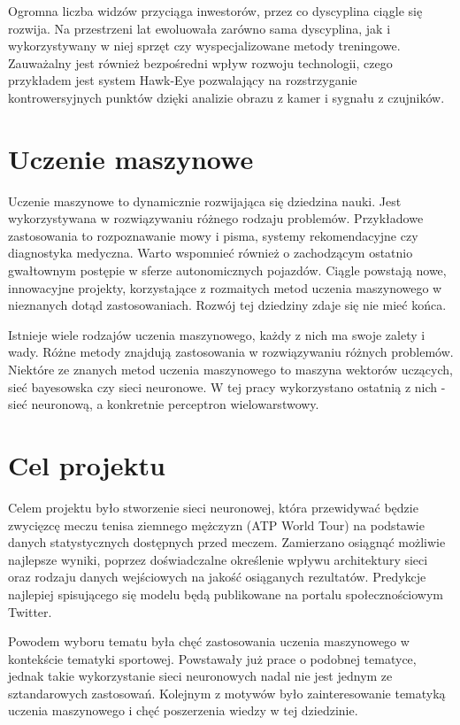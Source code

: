 Ogromna liczba widzów przyciąga inwestorów, przez co dyscyplina ciągle się rozwija. Na przestrzeni lat ewoluowała zarówno sama dyscyplina, jak i wykorzystywany w niej sprzęt czy wyspecjalizowane metody treningowe. Zauważalny jest również bezpośredni wpływ rozwoju technologii, czego przykładem jest system Hawk-Eye pozwalający na rozstrzyganie kontrowersyjnych punktów dzięki analizie obrazu z kamer i sygnału z czujników.



\section{Uczenie maszynowe}
Uczenie maszynowe to dynamicznie rozwijająca się dziedzina nauki. Jest wykorzystywana w rozwiązywaniu różnego rodzaju problemów. Przykładowe zastosowania to rozpoznawanie mowy i pisma, systemy rekomendacyjne czy diagnostyka medyczna. Warto wspomnieć również o zachodzącym ostatnio gwałtownym postępie w sferze autonomicznych pojazdów. Ciągle powstają nowe, innowacyjne projekty, korzystające z rozmaitych metod uczenia maszynowego w nieznanych dotąd zastosowaniach. Rozwój tej dziedziny zdaje się nie mieć końca.

Istnieje wiele rodzajów uczenia maszynowego, każdy z nich ma swoje zalety i wady. Różne metody znajdują zastosowania w rozwiązywaniu różnych problemów. Niektóre ze znanych metod uczenia maszynowego to maszyna wektorów uczących, sieć bayesowska czy sieci neuronowe. W tej pracy wykorzystano ostatnią z nich - sieć neuronową, a konkretnie perceptron wielowarstwowy.

\section{Cel projektu}
Celem projektu było stworzenie sieci neuronowej, która przewidywać będzie zwycięzcę meczu tenisa ziemnego mężczyzn (ATP World Tour) na podstawie danych statystycznych dostępnych przed meczem. Zamierzano osiągnąć możliwie najlepsze wyniki, poprzez doświadczalne określenie wpływu architektury sieci oraz rodzaju danych wejściowych na jakość osiąganych rezultatów. Predykcje najlepiej spisującego się modelu będą publikowane na portalu społecznościowym Twitter.

Powodem wyboru tematu była chęć zastosowania uczenia maszynowego w kontekście tematyki sportowej. Powstawały już prace o podobnej tematyce, jednak takie wykorzystanie sieci neuronowych nadal nie jest jednym ze sztandarowych zastosowań. Kolejnym z motywów było zainteresowanie tematyką uczenia maszynowego i chęć poszerzenia wiedzy w tej dziedzinie.


